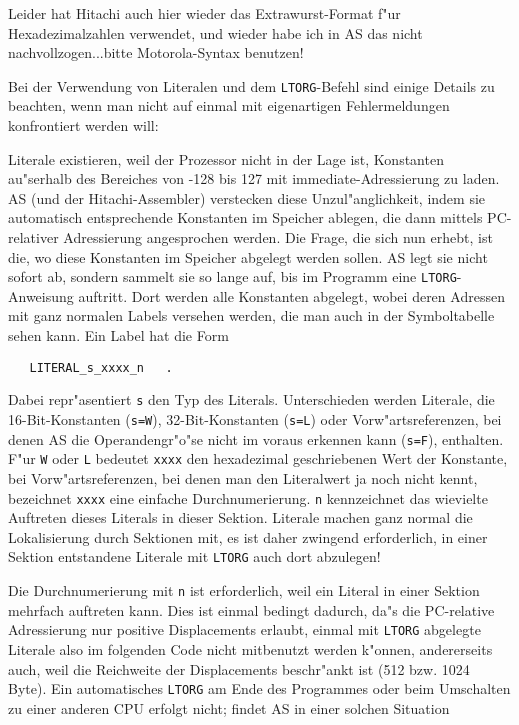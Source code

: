 \documentclass[12pt,a4paper,twoside]{report}
\newcommand{\tty}[1]{{\tt #1}}
\begin{document}
{Leider hat Hitachi auch hier wieder das Extrawurst-Format f"ur
Hexadezimalzahlen verwendet, und wieder habe ich in AS das nicht
nachvollzogen...bitte Motorola-Syntax benutzen!
\par
Bei der Verwendung von Literalen und dem \tty{LTORG}-Befehl sind
einige Details zu beachten, wenn man nicht auf einmal mit eigenartigen
Fehlermeldungen konfrontiert werden will:
\par
Literale existieren, weil der Prozessor nicht in der Lage ist, Konstanten
au"serhalb des Bereiches von -128 bis 127 mit immediate-Adressierung
zu laden.  AS (und der Hitachi-Assembler) verstecken diese Unzul"anglichkeit,
indem sie automatisch entsprechende Konstanten im Speicher ablegen, die
dann mittels PC-relativer Adressierung angesprochen werden.  Die Frage, die
sich nun erhebt, ist die, wo diese Konstanten im Speicher abgelegt werden
sollen.  AS legt sie nicht sofort ab, sondern sammelt sie so lange
auf, bis im Programm eine \tty{LTORG}-Anweisung auftritt.  Dort werden
alle Konstanten abgelegt, wobei deren Adressen mit ganz normalen
Labels versehen werden, die man auch in der Symboltabelle sehen kann.
Ein Label hat die Form
\begin{verbatim}
   LITERAL_s_xxxx_n   .
\end{verbatim}
Dabei repr"asentiert \tty{s} den Typ des Literals.  Unterschieden werden
Literale, die 16-Bit-Konstanten (\tty{s=W}), 32-Bit-Konstanten (\tty{s=L})
oder Vorw"artsreferenzen, bei denen AS die Operandengr"o"se nicht
im voraus erkennen kann (\tty{s=F}), enthalten.  F"ur \tty{W} oder \tty{L}
bedeutet \tty{xxxx} den hexadezimal geschriebenen Wert der Konstante, bei
Vorw"artsreferenzen, bei denen man den Literalwert ja noch nicht kennt,
bezeichnet \tty{xxxx} eine einfache Durchnumerierung. \tty{n} kennzeichnet
das wievielte Auftreten dieses Literals in dieser Sektion.  Literale machen
ganz normal die Lokalisierung durch Sektionen mit, es ist daher zwingend
erforderlich, in einer Sektion entstandene Literale mit \tty{LTORG} auch
dort abzulegen!
\par
Die Durchnumerierung mit \tty{n} ist erforderlich, weil ein Literal in
einer Sektion mehrfach auftreten kann.  Dies ist einmal bedingt dadurch,
da"s die PC-relative Adressierung nur positive Displacements erlaubt,
einmal mit \tty{LTORG} abgelegte Literale also im folgenden Code nicht
mitbenutzt werden k"onnen, andererseits auch, weil die Reichweite der
Displacements beschr"ankt ist (512 bzw. 1024 Byte).
Ein automatisches \tty{LTORG} am Ende des Programmes oder beim Umschalten
zu einer anderen CPU erfolgt nicht; findet AS in einer solchen Situation
}
\end{document}
